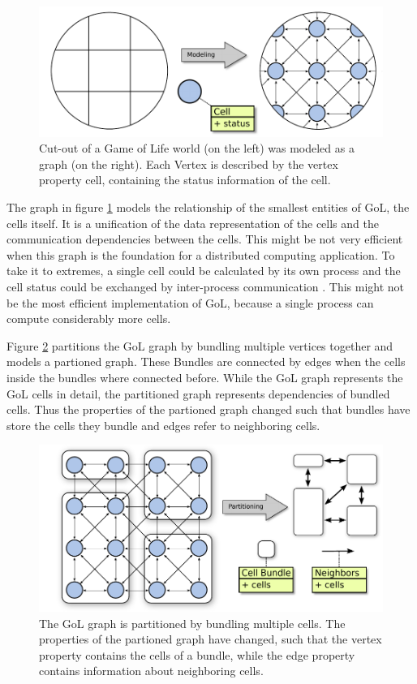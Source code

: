 \begin{figure}[H]
  \centering \includegraphics[width=\textwidth]{graphics/30_gol}
  \caption{Cut-out of a Game of Life world (on the left) was modeled
    as a graph (on the right). Each Vertex is described by the vertex
    property cell, containing the status information of the cell.}
  \label{fig:gol}
\end{figure}

The graph in figure \ref{fig:gol} models the relationship of the
smallest entities of GoL, the cells itself. It is a unification of the
data representation of the cells and the communication dependencies
between the cells. This might be not very efficient when this graph is
the foundation for a distributed computing application. To take it to
extremes, a single cell could be calculated by its own process and the
cell status could be exchanged by inter-process communication
. This might not be the most efficient implementation of GoL,
because a single process can compute considerably more cells.

Figure \ref{fig:gol_bundle} partitions the GoL graph by bundling
multiple vertices together and models a partioned graph. These Bundles are
connected by edges when the cells inside the bundles where connected
before. While the GoL graph represents the GoL cells in detail, the
partitioned graph represents dependencies of bundled cells. Thus
the properties of the partioned graph changed such that bundles
have store the cells they bundle and edges refer to neighboring
cells.

\begin{figure}[H]
  \centering \includegraphics[width=\textwidth]{graphics/30_gol_bundle}
  \caption{The GoL graph is partitioned by bundling multiple
    cells. The properties of the partioned graph have changed, such
    that the vertex property contains the cells of a bundle, while the
    edge property contains information about neighboring cells.}
  \label{fig:gol_bundle}
\end{figure}

